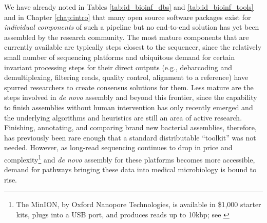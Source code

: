 We have already noted in Tables \ref{tab:id_bioinf_dbs} and \ref{tab:id_bioinf_tools} and in Chapter \ref{chap:intro} that many open source software packages exist for \emph{individual components} of such a pipeline but no end-to-end solution has yet been assembled by the research community. The most mature components that are currently available are typically steps closest to the sequencer, since the relatively small number of sequencing platforms and ubiquitous demand for certain invariant processing steps for their direct outputs (e.g., debarcoding and demultiplexing, filtering reads, quality control, alignment to a reference) have spurred researchers to create consensus solutions for them. Less mature are the steps involved in \emph{de novo} assembly and beyond this frontier, since the capability to finish assemblies without human intervention has only recently emerged\autocite{Bashir2012} and the underlying algorithms and heuristics are still an area of active research.\autocite{Sohn2016} Finishing, annotating, and comparing brand new bacterial assemblies, therefore, has previously been rare enough that a standard distributable ``toolkit'' was not needed. However, as long-read sequencing continues to drop in price and complexity\footnote{The MinION, by Oxford Nanopore Technologies, is available in \$1,000 starter kits, plugs into a USB port, and produces reads up to 10kbp; see \textcite{Check2014}} and \emph{de novo} assembly for these platforms becomes more accessible, demand for pathways bringing these data into medical microbiology is bound to rise.\autocite{Judge2016}

